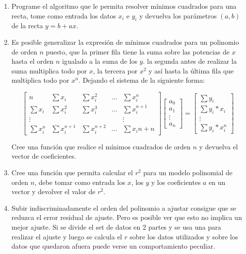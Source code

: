 \documentclass[a4paper,11pt]{article}
\theoremstyle{mytheor}
\begin{document}
\begin{enumerate}[label=\Roman*]

\item \label{enum:minCuadRec} Programe el algoritmo que le permita resolver mínimos cuadrados para una recta, tome como entrada los datos $x_i$ e $y_i$ y devuelva los parámetros $(a,b)$ de la recta $y = b + ax$.

\item \label{enum:minCuadN} Es posible generalizar la expresión de mínimos cuadrados para un polinomio de orden $n$ puesto, que la primer fila tiene la suma sobre las potencias de $x$ hasta el orden $n$ igualado a la suma de los $y$. la segunda antes de realizar la suma multiplica todo por $x$, la tercera por $x^2$ y así hasta la última fila que multiplica todo por $x^n$. Dejando el sistema de la siguiente forma:

$$\begin{bmatrix}
n         & \sum x_i  		& \sum x_i^2	&\dots  & \sum x_i^n 		\\
\sum x_i  & \sum x_i^2  	& \sum x_i^3	&\dots  & \sum x_i^{n+1} 	\\
\vdots    &					&				&		& \vdots         	\\
\sum x_i^n& \sum x_i^{n+1}	& \sum x_i^{n+2}&\dots  & \sum x_i{n+n}
\end{bmatrix} \begin{bmatrix}
a_0 \\
a_1 \\
\vdots \\
a_n
\end{bmatrix} = \begin{bmatrix}
\sum y_i \\
\sum y_i*x_i \\
\vdots \\
\sum y_i*x_i^n
\end{bmatrix}  $$

Cree una función que realice el mínimos cuadrados de orden $n$ y devuelva el vector de coeficientes.

\item \label{enum:r2} Cree una función que permita calcular el $r^2$ para un modelo polinomial de orden $n$, debe tomar como entrada los $x$, los $y$ y los coeficientes $a$ en un vector y devolver el valor de $r^2$.


\item \label{enum:splitTrainTest} Subir indiscriminadamente el orden del polinomio a ajustar consigue que se reduzca el error residual de ajuste. Pero es posible ver que esto no implica un mejor ajuste. Si se divide el set de datos en 2 partes y se usa una para realizar el ajuste y luego se calcula el $r$ sobre los datos utilizados y sobre los datos que quedaron afuera puede verse un comportamiento peculiar. 


\end{enumerate}
\end{document}
